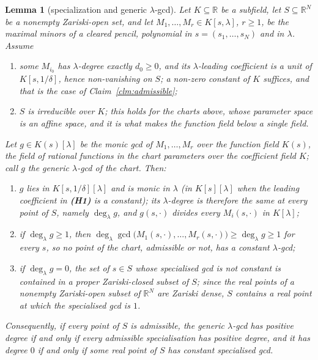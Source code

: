 \documentclass[journal]{IEEEtran}
\theoremstyle{plainn}
\newtheorem{lem}[thm]{Lemma}
\theoremstyle{remark}
\begin{document}
\begin{lem}[specialization and generic $\lambda$-gcd]\label{lem:genericgcd}
Let $K\subseteq\mathbb R$ be a subfield, let $S\subseteq\mathbb R^N$ be a nonempty Zariski-open set, and let
$M_1,\dots,M_r\in K[s,\lambda]$, $r\ge1$, be the maximal minors of a cleared pencil, polynomial in
$s=(s_1,\dots,s_N)$ and in $\lambda$. Assume
\begin{enumerate}[label=\textbf{(H\arabic*)},leftmargin=*,itemsep=1pt,topsep=2pt]
\item some $M_{i_0}$ has $\lambda$-degree exactly $d_0\ge0$, and its $\lambda$-leading coefficient is a
unit of $K[s,1/\delta]$, hence non-vanishing on $S$; a non-zero constant of $K$ suffices, and that is
the case of Claim~\ref{clm:admissible};
\item $S$ is irreducible over $K$; this holds for the charts above, whose parameter space is an affine
space, and it is what makes the function field below a single field.
\end{enumerate}
Let $g\in K(s)[\lambda]$ be the monic gcd of $M_1,\dots,M_r$ over the function field $K(s)$, the field of
rational functions in the chart parameters over the coefficient field $K$; call $g$ the \emph{generic
$\lambda$-gcd} of the chart. Then:
\begin{enumerate}[label=(\arabic*),leftmargin=*,itemsep=1pt,topsep=2pt]
\item $g$ lies in $K[s,1/\delta][\lambda]$ and is monic in $\lambda$ (in $K[s][\lambda]$ when the leading
coefficient in \textbf{(H1)} is a constant); its $\lambda$-degree is therefore the same at every point of
$S$, namely $\deg_\lambda g$, and $g(s,\cdot)$ divides every $M_i(s,\cdot)$ in $K[\lambda]$;
\item if $\deg_\lambda g\ge1$, then
$\deg_\lambda\gcd\bigl(M_1(s,\cdot),\dots,M_r(s,\cdot)\bigr)\ge\deg_\lambda g\ge1$ for every $s$, so no
point of the chart, admissible or not, has a constant $\lambda$-gcd;
\item if $\deg_\lambda g=0$, the set of $s\in S$ whose specialised gcd is not constant is contained in a
proper Zariski-closed subset of $S$; since the real points of a nonempty Zariski-open subset of
$\mathbb R^N$ are Zariski dense, $S$ contains a real point at which the specialised gcd is $1$.
\end{enumerate}
Consequently, if every point of $S$ is admissible, the generic $\lambda$-gcd has positive degree if and only
if every admissible specialisation has positive degree, and it has degree $0$ if and only if some real point
of $S$ has constant specialised gcd.
\end{lem}
\end{document}
